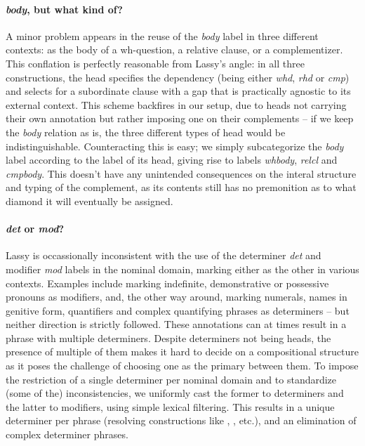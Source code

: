 \paragraph{\textit{body}, but what kind of?}
A minor problem appears in the reuse of the \textit{body} label in three different contexts: as the body of a wh-question, a relative clause, or a complementizer.
This conflation is perfectly reasonable from Lassy's angle: in all three constructions, the head specifies the dependency (being either \textit{whd}, \textit{rhd} or \textit{cmp}) and selects for a subordinate clause with a gap that is practically agnostic to its external context.
This scheme backfires in our setup, due to heads not carrying their own annotation but rather imposing one on their complements -- if we keep the \textit{body} relation as is, the three different types of head would be indistinguishable.
Counteracting this is easy; we simply subcategorize the \textit{body} label according to the label of its head, giving rise to labels \textit{whbody}, \textit{relcl} and \textit{cmpbody}.
This doesn't have any unintended consequences on the interal structure and typing of the complement, as its contents still has no premonition as to what diamond it will eventually be assigned.

\paragraph{\textit{det} or \textit{mod}?}
Lassy is occassionally inconsistent with the use of the determiner \textit{det} and modifier \textit{mod} labels in the nominal domain, marking either as the other in various contexts.
Examples include marking indefinite, demonstrative or possessive pronouns as modifiers, and, the other way around, marking numerals, names in genitive form, quantifiers and complex quantifying phrases as determiners -- but neither direction is strictly followed.
These annotations can at times result in a phrase with multiple determiners.
Despite determiners not being heads, the presence of multiple of them makes it hard to decide on a compositional structure as it poses the challenge of choosing one as the primary between them.
To impose the restriction of a single determiner per nominal domain and to standardize (some of the) inconsistencies, we uniformly cast the former to determiners and the latter to modifiers, using simple lexical filtering.
This results in a unique determiner per phrase (resolving constructions like , , etc.), and an elimination of complex determiner phrases.

